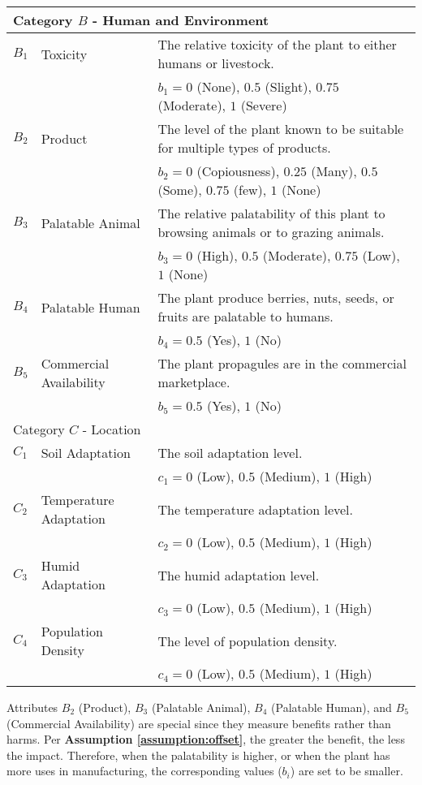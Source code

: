 \documentclass[12pt]{article}
\begin{document}
{{\begin{longtable}{p{0.2in}p{1.5in}p{4.3in}}
				\midrule
				\multicolumn{3}{l}{Category $B$ - Human and Environment}  \\
				\midrule
				
				$B_1$ & Toxicity & The relative toxicity of the plant to either humans or livestock.\\
					&& $b_1=0$ (None), $0.5$ (Slight), $0.75$ (Moderate), $1$ (Severe)\\
				$B_2$ & Product & The level of the plant known to be suitable for multiple types of products.\\
					&& $b_2=0$ (Copiousness), $0.25$ (Many), $0.5$ (Some), $0.75$ (few), $1$ (None)\\
				$B_3$ & Palatable Animal & The relative palatability of this plant to browsing animals or to grazing animals.\\
					&& $b_3=0$ (High), $0.5$ (Moderate), $0.75$ (Low), $1$ (None)\\
				$B_4$ & Palatable Human & The plant produce berries, nuts, seeds, or fruits are palatable to humans. \\
					&& $b_4=0.5$ (Yes), $1$ (No)\\
				$B_5$ & Commercial Availability & The plant propagules are in the commercial marketplace. \\
					&& $b_5=0.5$ (Yes), $1$ (No)\\
			
				\midrule
				\multicolumn{3}{l}{Category $C$ - Location}  \\
				\midrule
				
				$C_1$ & Soil Adaptation & The soil adaptation level.\\
				&& $c_1=0$ (Low), $0.5$ (Medium), $1$ (High)\\
				$C_2$ & Temperature Adaptation & The temperature adaptation level.\\
				&& $c_2=0$ (Low), $0.5$ (Medium), $1$ (High)\\
				$C_3$ & Humid Adaptation & The humid adaptation level.\\
				&& $c_3=0$ (Low), $0.5$ (Medium), $1$ (High)\\
				$C_4$ & Population Density & The level of population density.\\
				&& $c_4=0$ (Low), $0.5$ (Medium), $1$ (High)\\
			
				\bottomrule
			
			\end{longtable}
			}
		}
		
		Attributes $B_2$ (Product), $B_3$ (Palatable Animal), $B_4$ (Palatable Human), and $B_5$ (Commercial Availability) are special since they measure benefits rather than harms.  Per \textbf{Assumption \ref{assumption:offset}}, the greater the benefit, the less the impact.  Therefore, when the palatability is higher, or when the plant has more uses in manufacturing, the corresponding values ($b_i$) are set to be smaller.
		
\end{document}
